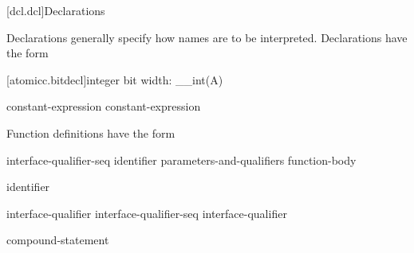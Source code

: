 [dcl.dcl]{Declarations}%


\pnum
Declarations generally specify how names are to be interpreted. Declarations have
the form

[atomicc.bitdecl]{integer bit width: __int(A)}

\begin{bnf}
\br
     \terminal{(} constant-expression \terminal{)} \br
     \terminal{(} constant-expression \terminal{)}
\end{bnf}

\pnum
Function definitions have the form

\begin{bnf}
\br
     interface-qualifier-seq identifier parameters-and-qualifiers function-body
\end{bnf}

\begin{bnf}
\br
    identifier 

 \br
    interface-qualifier \br
    interface-qualifier-seq interface-qualifier
\end{bnf}

\begin{bnf}
\br
      compound-statement
\end{bnf}

